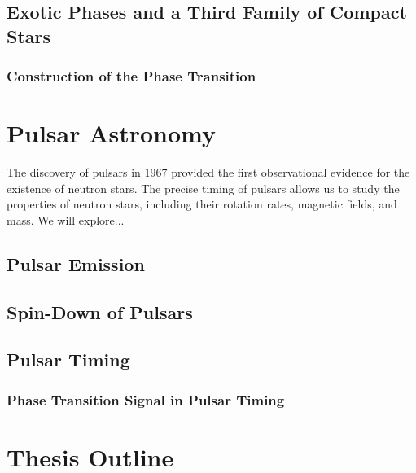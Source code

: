 \documentclass[main.tex]{subfiles}
\begin{document}
    \subsection{Exotic Phases and a Third Family of Compact Stars}
    \subsubsection{Construction of the Phase Transition}

    \section{Pulsar Astronomy}\label{sec:ch1:pulsar_astro}
    The discovery of pulsars in 1967 provided the first observational evidence for the existence of neutron stars. The precise timing of pulsars allows us to study the properties of neutron stars, including their rotation rates, magnetic fields, and mass. We will explore...

    \subsection{Pulsar Emission}
    \subsection{Spin-Down of Pulsars}
    \subsection{Pulsar Timing}
    \subsubsection{Phase Transition Signal in Pulsar Timing}

    \section{Thesis Outline}
    
\end{document}
